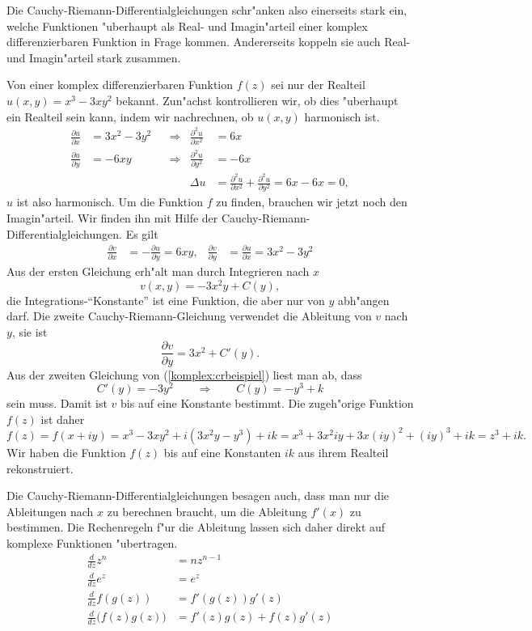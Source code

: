 Die Cauchy-Riemann-Differentialgleichungen schr"anken also einerseits stark
ein, welche Funktionen "uberhaupt als Real- und Imagin"arteil einer
komplex differenzierbaren Funktion in Frage kommen.
Andererseits koppeln sie auch Real- und Imagin"arteil stark zusammen.

\begin{beispiel}
Von einer komplex differenzierbaren Funktion $f(z)$ sei nur der Realteil
$u(x,y)=x^3 -3xy^2$ bekannt.
Zun"achst kontrollieren wir, ob dies "uberhaupt ein Realteil sein kann,
indem wir nachrechnen, ob $u(x,y)$ harmonisch ist.
\begin{equation*}
\begin{aligned}
\frac{\partial u}{\partial x}
&=
3x^2-3y^2
&&\Rightarrow&
\frac{\partial^2 u}{\partial x^2}
&=
6x
\\
\frac{\partial u}{\partial y}
&=
-6xy
&&\Rightarrow&
\frac{\partial^2 u}{\partial y^2}
&=
-6x
\\
&&&&\Delta u&=\frac{\partial^2u}{\partial x^2}+\frac{\partial^2u}{\partial y^2}=6x-6x=0,
\end{aligned}
\end{equation*}
$u$ ist also harmonisch.
Um die Funktion $f$ zu finden, brauchen wir jetzt noch den Imagin"arteil.
Wir finden ihn mit Hilfe der Cauchy-Riemann-Differentialgleichungen.
Es gilt
\begin{equation}
\begin{aligned}
\frac{\partial v}{\partial x}
&=
-\frac{\partial u}{\partial y}=6xy,
&
\frac{\partial v}{\partial y}
&=
\frac{\partial u}{\partial x}=3x^2-3y^2
\end{aligned}
\label{komplex:crbeispiel}
\end{equation}
Aus der ersten Gleichung erh"alt man durch Integrieren nach $x$ 
\[
v(x,y)=-3x^2y + C(y),
\]
die Integrations-``Konstante'' ist eine Funktion, die aber nur von $y$
abh"angen darf.
Die zweite Cauchy-Riemann-Gleichung verwendet die Ableitung von $v$ nach $y$,
sie ist
\[
\frac{\partial v}{\partial y}=3x^2+C'(y).
\]
Aus der zweiten Gleichung von (\ref{komplex:crbeispiel}) liest man
ab, dass
\[
C'(y)=-3y^2
\qquad\Rightarrow\qquad
C(y)=-y^3+k
\]
sein muss.
Damit ist $v$ bis auf eine Konstante bestimmt.
Die zugeh"orige Funktion $f(z)$ ist daher
\[
f(z)=f(x+iy)=x^3-3xy^2+i(3x^2y-y^3)+ik
=x^3 + 3x^2iy + 3x(iy)^2+(iy)^3+ik=z^3+ik.
\]
Wir haben die Funktion $f(z)$ bis auf eine Konstanten $ik$ 
aus ihrem Realteil rekonstruiert.
\end{beispiel}

Die Cauchy-Riemann-Differentialgleichungen besagen auch, dass man nur
die Ableitungen nach $x$ zu berechnen braucht, um die Ableitung $f'(x)$
zu bestimmen.
Die Rechenregeln f"ur die Ableitung lassen sich daher direkt auf
komplexe Funktionen "ubertragen.
\begin{align*}
\frac{d}{dz}z^n
&=
nz^{n-1}
\\
\frac{d}{dz}e^z
&=
e^z
\\
\frac{d}{dz}f(g(z))
&=
f'(g(z)) g'(z)
\\
\frac{d}{dz}\bigl(f(z)g(z)\bigr)
&=
f'(z)g(z)+f(z)g'(z)
\end{align*}

